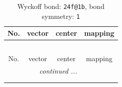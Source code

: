 \documentclass[fleqn,8pt]{jsarticle}
\begin{document}
\renewcommand{\arraystretch}{1.2}
\begin{longtable}{cccc}
\caption{Wyckoff bond: {\tt 24f@1b}, bond symmetry: {\tt 1}}
 \\
 \hline \hline
No. & vector & center & mapping \\ \hline \endfirsthead

\multicolumn{3}{l}{\tablename\ \thetable{}} \\
 \hline \hline
No. & vector & center & mapping \\ \hline \endhead

 \hline \hline
\multicolumn{3}{r}{\footnotesize\it continued ...} \\ \endfoot

 \hline \hline
\multicolumn{3}{r}{} \\ \endlastfoot


\end{longtable}
\end{document}
